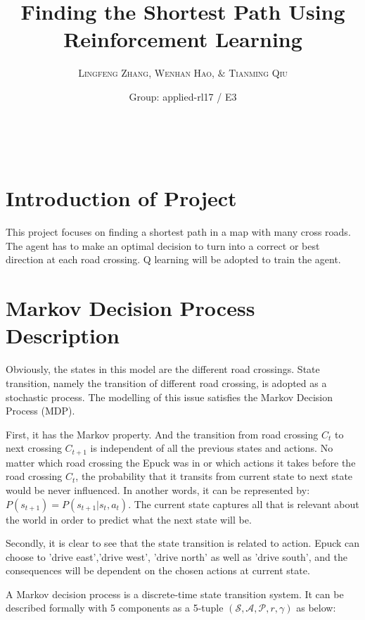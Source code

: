 \documentclass[a4paper, 11pt]{article} %
\title{\textbf{Finding the Shortest Path Using Reinforcement Learning}} %
\author{\textsc{Lingfeng Zhang, Wenhan Hao, $\&$ Tianming Qiu} %
\\{\textit{}}} %
\date{Group: applied-rl17 / E3} %
\makeatletter
\renewcommand{\maketitle}{ %
\begin{flushright} %
{\LARGE\@title} %

\vspace{50pt} %

{\large\@author} %
\\\@date %

\vspace{40pt} %
\end{flushright}
}
\makeatother
\begin{document}
\maketitle %




\section{Introduction of Project}
This project focuses on finding a shortest path in a map with many cross roads. The agent has to make an optimal decision to turn into a correct or best direction at each road crossing. Q learning will be adopted to train the agent.


\section{Markov Decision Process Description}

Obviously, the states in this model are the different road crossings. State transition, namely the transition of different road crossing, is adopted as a stochastic process. The modelling of this issue satisfies the Markov Decision Process (MDP).
 
First, it has the Markov property. And the transition from road crossing $C_{t}$ to next crossing $C_{t+1}$ is independent of all the previous states and actions. No matter which road crossing the Epuck was in or which actions it takes before the road crossing $C_{t}$, the probability that it transits from current state to next state would be never influenced. In another words, it can be represented by: $P(s_{t+1})=P(s_{t+1}|s_{t},a_{t})$. The current state captures all that is relevant about the world in order to predict what the next state will be.

Secondly, it is clear to see that the state transition is related to action. Epuck can choose to 'drive east','drive west', 'drive north' as well as 'drive south', and the consequences will be dependent on the chosen actions at current state. 

A Markov decision process is a discrete-time state transition system. It can be described formally with 5 components as a 5-tuple $(\mathcal{S,A,P}, r,\gamma)$ as below:
\end{document}
